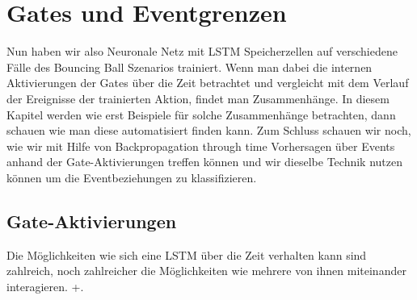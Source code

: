 \chapter{Gates und Eventgrenzen}
\label{ch:untersuchung}
Nun haben wir also Neuronale Netz mit LSTM Speicherzellen auf verschiedene Fälle des Bouncing Ball Szenarios trainiert. Wenn man dabei die internen Aktivierungen der Gates über die Zeit betrachtet und vergleicht mit dem Verlauf der Ereignisse der trainierten Aktion, findet man Zusammenhänge. In diesem Kapitel werden wie erst Beispiele für solche Zusammenhänge betrachten, dann schauen wie man diese automatisiert finden kann. Zum Schluss schauen wir noch, wie wir mit Hilfe von Backpropagation through time Vorhersagen über Events anhand der Gate-Aktivierungen treffen können und wir dieselbe Technik nutzen können um die Eventbeziehungen zu klassifizieren.
\section{Gate-Aktivierungen}
Die Möglichkeiten wie sich eine LSTM über die Zeit verhalten kann sind zahlreich, noch zahlreicher die Möglichkeiten wie mehrere von ihnen miteinander interagieren. +\cite{bib:graves}. 





